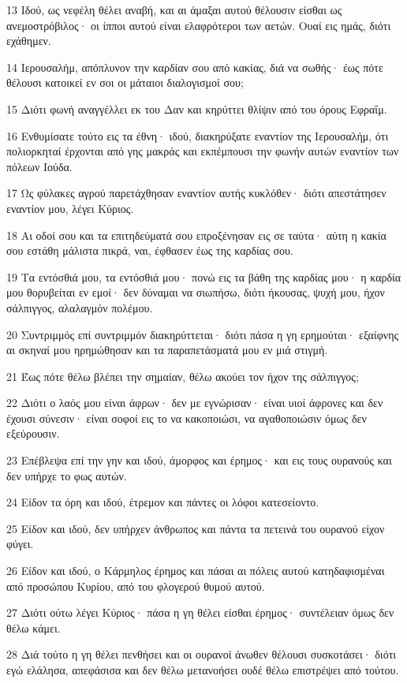 \par 13 Ιδού, ως νεφέλη θέλει αναβή, και αι άμαξαι αυτού θέλουσιν είσθαι ως ανεμοστρόβιλος· οι ίπποι αυτού είναι ελαφρότεροι των αετών. Ουαί εις ημάς, διότι εχάθημεν.
\par 14 Ιερουσαλήμ, απόπλυνον την καρδίαν σου από κακίας, διά να σωθής· έως πότε θέλουσι κατοικεί εν σοι οι μάταιοι διαλογισμοί σου;
\par 15 Διότι φωνή αναγγέλλει εκ του Δαν και κηρύττει θλίψιν από του όρους Εφραΐμ.
\par 16 Ενθυμίσατε τούτο εις τα έθνη· ιδού, διακηρύξατε εναντίον της Ιερουσαλήμ, ότι πολιορκηταί έρχονται από γης μακράς και εκπέμπουσι την φωνήν αυτών εναντίον των πόλεων Ιούδα.
\par 17 Ως φύλακες αγρού παρετάχθησαν εναντίον αυτής κυκλόθεν· διότι απεστάτησεν εναντίον μου, λέγει Κύριος.
\par 18 Αι οδοί σου και τα επιτηδεύματά σου επροξένησαν εις σε ταύτα· αύτη η κακία σου εστάθη μάλιστα πικρά, ναι, έφθασεν έως της καρδίας σου.
\par 19 Τα εντόσθιά μου, τα εντόσθιά μου· πονώ εις τα βάθη της καρδίας μου· η καρδία μου θορυβείται εν εμοί· δεν δύναμαι να σιωπήσω, διότι ήκουσας, ψυχή μου, ήχον σάλπιγγος, αλαλαγμόν πολέμου.
\par 20 Συντριμμός επί συντριμμόν διακηρύττεται· διότι πάσα η γη ερημούται· εξαίφνης αι σκηναί μου ηρημώθησαν και τα παραπετάσματά μου εν μιά στιγμή.
\par 21 Έως πότε θέλω βλέπει την σημαίαν, θέλω ακούει τον ήχον της σάλπιγγος;
\par 22 Διότι ο λαός μου είναι άφρων· δεν με εγνώρισαν· είναι υιοί άφρονες και δεν έχουσι σύνεσιν· είναι σοφοί εις το να κακοποιώσι, να αγαθοποιώσιν όμως δεν εξεύρουσιν.
\par 23 Επέβλεψα επί την γην και ιδού, άμορφος και έρημος· και εις τους ουρανούς και δεν υπήρχε το φως αυτών.
\par 24 Είδον τα όρη και ιδού, έτρεμον και πάντες οι λόφοι κατεσείοντο.
\par 25 Είδον και ιδού, δεν υπήρχεν άνθρωπος και πάντα τα πετεινά του ουρανού είχον φύγει.
\par 26 Είδον και ιδού, ο Κάρμηλος έρημος και πάσαι αι πόλεις αυτού κατηδαφισμέναι από προσώπου Κυρίου, από του φλογερού θυμού αυτού.
\par 27 Διότι ούτω λέγει Κύριος· πάσα η γη θέλει είσθαι έρημος· συντέλειαν όμως δεν θέλω κάμει.
\par 28 Διά τούτο η γη θέλει πενθήσει και οι ουρανοί άνωθεν θέλουσι συσκοτάσει· διότι εγώ ελάλησα, απεφάσισα και δεν θέλω μετανοήσει ουδέ θέλω επιστρέψει από τούτου.
